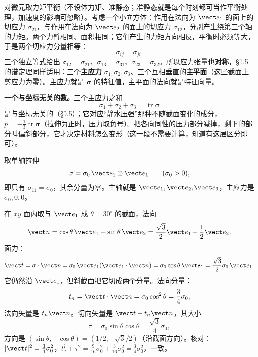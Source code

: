 \documentclass[11pt]{ctexart}
\newcommand{\ten}[1]{\mathbf{#1}}
\newcommand{\tr}{\operatorname{tr}}
\let\origsubhdr\subhdr
\renewcommand{\subhdr}[1]{\par\needspace{3\baselineskip}\origsubhdr{#1}}
\begin{document}

对微元取力矩平衡（不设体力矩、准静态；准静态就是每个时刻都可当作平衡处理，加速度的影响可忽略）。考虑一个小立方体：作用在法向为 $\vect e_1$ 的面上的切应力 $\sigma_{21}$，与作用在法向为 $\vect e_2$ 的面上的切应力 $\sigma_{12}$，分别产生绕第三个轴的力矩。两个力臂相同、面积相同；它们产生的力矩方向相反，平衡时必须等大，于是两个切应力分量相等：
\[
\sigma_{ij}=\sigma_{ji}.
\]
三个独立等式给出 $\sigma_{12}=\sigma_{21}$、$\sigma_{13}=\sigma_{31}$、$\sigma_{23}=\sigma_{32}$。所以应力张量也\textbf{对称}，§1.5 的谱定理同样适用：三个\textbf{主应力} $\sigma_1,\sigma_2,\sigma_3$、三个互相垂直的\textbf{主平面}（这些截面上剪应力为零）。主应力就是 $\ten\sigma$ 的特征值，主平面的法向就是特征向量。

\textbf{一个与坐标无关的数。}三个主应力之和
\[
\sigma_1+\sigma_2+\sigma_3=\tr\ten\sigma
\]
是与坐标无关的（§0.5）；它对应“静水压强”那种不随截面变化的成分，$p=-\tfrac13\tr\ten\sigma$（拉伸为正时，压力取负号）。把各向同性的压力部分减掉，剩下的部分叫偏斜部分，它才决定材料怎么变形（这一段不需要计算，知道有这层区分即可）。


取单轴拉伸
\[
\ten\sigma=\sigma_0\,\vect e_1\otimes\vect e_1
\qquad(\sigma_0>0),
\]
即只有 $\sigma_{11}=\sigma_0$，其余分量为零。主轴就是 $\vect e_1,\vect e_2,\vect e_3$，主应力是 $\sigma_0,0,0$。

在 $xy$ 面内取与 $\vect e_1$ 成 $\theta=30^\circ$ 的截面，法向
\[
\vect n=\cos\theta\,\vect e_1+\sin\theta\,\vect e_2=\frac{\sqrt3}{2}\vect e_1+\frac12\vect e_2 .
\]
面力：
\[
\vect t=\ten\sigma\cdot\vect n
=\sigma_0\,\vect e_1(\vect e_1\cdot\vect n)
=\sigma_0\cos\theta\,\vect e_1
=\frac{\sqrt3}{2}\sigma_0\,\vect e_1 .
\]
它仍然沿 $\vect e_1$，但斜截面把它切成两个分量。法向分量：
\[
t_n=\vect t\cdot\vect n=\sigma_0\cos^2\theta=\frac34\sigma_0,
\]
法向矢量是 $t_n\vect n$。切向矢量是 $\vect t-t_n\vect n$，其大小
\[
\tau=\sigma_0\sin\theta\cos\theta=\frac{\sqrt3}{4}\sigma_0,
\]
方向是 $(\sin\theta,-\cos\theta)=(1/2,-\sqrt3/2)$（沿截面方向）。核对：$|\vect t|^2=\tfrac34\sigma_0^2$，$t_n^2+\tau^2=\tfrac{9}{16}\sigma_0^2+\tfrac{3}{16}\sigma_0^2=\tfrac34\sigma_0^2$，一致。
\end{document}
